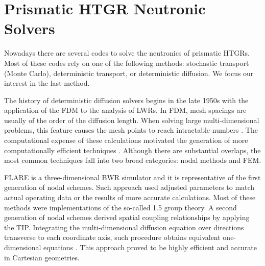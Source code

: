 \documentclass[11pt,letterpaper]{article}
\begin{document}
\section{Prismatic \gls{HTGR} Neutronic Solvers}

Nowadays there are several codes to solve the neutronics of prismatic \glspl{HTGR}.
Most of these codes rely on one of the following methods: stochastic transport (Monte Carlo), deterministic transport, or deterministic diffusion.
We focus our interest in the last method.

The history of deterministic diffusion solvers begins in the late 1950s with the application of the \gls{FDM} to the analysis of \glspl{LWR}.
In \gls{FDM}, mesh spacings are usually of the order of the diffusion length.
When solving large multi-dimensional problems, this feature causes the mesh points to reach intractable numbers \cite{lewis_finite_1986}.
The computational expense of these calculations motivated the generation of more computationally efficient techniques \cite{lawrence_progress_1986}.
Although there are substantial overlaps, the most common techniques fall into two broad categories: nodal methods and \gls{FEM}.

FLARE \cite{delp_flare_1964} is a three-dimensional \gls{BWR} simulator and it is representative of the first generation of nodal schemes.
Such approach used adjusted parameters to match actual operating data or the results of more accurate calculations.
Most of these methods were implementations of the so-called 1.5 group theory.
A second generation of nodal schemes derived spatial coupling relationships by applying the \gls{TIP}.
Integrating the multi-dimensional diffusion equation over directions transverse to each coordinate axis, such procedure obtains equivalent one-dimensional equations \cite{lawrence_progress_1986}.
This approach proved to be highly efficient and accurate in Cartesian geometries.
\end{document}
